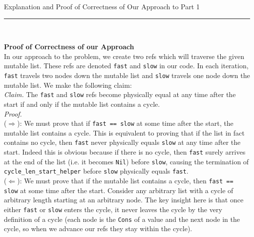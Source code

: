 \documentclass[paper=a4, fontsize=11pt]{scrartcl}
\begin{document}
\newcommand{\horrule}[1]{\rule{\linewidth}{#1}} %


\begin{center}
\Large{Explanation and Proof of Correctness of Our Approach to Part 1}
\horrule{0.5pt} \\[0.4cm] %
\end{center}

\textbf{Proof of Correctness of our Approach}\\

In our approach to the problem, we create two refs which will traverse the given mutable list. These refs are denoted \texttt{fast} and \texttt{slow} in our code. In each iteration, \texttt{fast} travels two nodes down the mutable list and \texttt{slow} travels one node down the mutable list. We make the following claim:\\

\textit{Claim.} The \texttt{fast} and \texttt{slow} refs become physically equal at any time after the start if and only if the mutable list contains a cycle.\\

\textit{Proof.}\\
($\Rightarrow$): We must prove that if \texttt{fast == slow} at some time after the start, the mutable list contains a cycle. This is equivalent to proving that if the list in fact contains no cycle, then \texttt{fast} never physically equals \texttt{slow} at any time after the start. Indeed this is obvious because if there is no cycle, then \texttt{fast} surely arrives at the end of the list (i.e. it becomes \texttt{Nil}) before \texttt{slow}, causing the termination of \texttt{cycle\_len\_start\_helper} before \texttt{slow} physically equals \texttt{fast}.\\

($\Leftarrow$): We must prove that if the mutable list contains a cycle, then \texttt{fast == slow} at some time after the start. Consider any arbitrary list with a cycle of arbitrary length starting at an arbitrary node. The key insight here is that once either \texttt{fast} or \texttt{slow} enters the cycle, it never leaves the cycle by the very definition of a cycle (each node is the \texttt{Cons} of a value and the next node in the cycle, so when we advance our refs they stay within the cycle).\\
\end{document}
